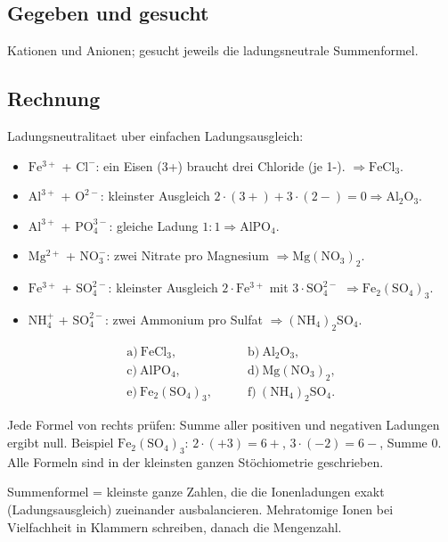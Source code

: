 
\subsection*{Gegeben und gesucht}
Kationen und Anionen; gesucht jeweils die ladungsneutrale Summenformel.

\subsection*{Rechnung}
Ladungsneutralitaet uber einfachen Ladungsausgleich:
\begin{itemize}
  \item[a)] $\mathrm{Fe^{3+}}$ + $\mathrm{Cl^-}$: ein Eisen (3+) braucht drei
        Chloride (je 1-). $\Rightarrow \mathrm{FeCl_3}$.
  \item[b)] $\mathrm{Al^{3+}}$ + $\mathrm{O^{2-}}$: kleinster Ausgleich
        $2\cdot(3+) + 3\cdot(2-) = 0 \Rightarrow \mathrm{Al_2O_3}$.
  \item[c)] $\mathrm{Al^{3+}}$ + $\mathrm{PO_4^{3-}}$: gleiche Ladung
        $1:1 \Rightarrow \mathrm{AlPO_4}$.
  \item[d)] $\mathrm{Mg^{2+}}$ + $\mathrm{NO_3^-}$: zwei Nitrate pro Magnesium
        $\Rightarrow \mathrm{Mg(NO_3)_2}$.
  \item[e)] $\mathrm{Fe^{3+}}$ + $\mathrm{SO_4^{2-}}$: kleinster Ausgleich
        $2\cdot\mathrm{Fe^{3+}}$ mit $3\cdot\mathrm{SO_4^{2-}}$
        $\Rightarrow \mathrm{Fe_2(SO_4)_3}$.
  \item[f)] $\mathrm{NH_4^+}$ + $\mathrm{SO_4^{2-}}$: zwei Ammonium pro Sulfat
        $\Rightarrow \mathrm{(NH_4)_2SO_4}$.
\end{itemize}

\begin{ergebnis}
\begin{align*}
  \mathrm{a)\ FeCl_3,} &\qquad \mathrm{b)\ Al_2O_3,}\\
  \mathrm{c)\ AlPO_4,} &\qquad \mathrm{d)\ Mg(NO_3)_2,}\\
  \mathrm{e)\ Fe_2(SO_4)_3,} &\qquad \mathrm{f)\ (NH_4)_2SO_4.}
\end{align*}
\end{ergebnis}

\begin{kontrolle}
Jede Formel von rechts prüfen: Summe aller positiven und negativen Ladungen
ergibt null. Beispiel $\mathrm{Fe_2(SO_4)_3}$:
$2\cdot(+3) = 6+$, $3\cdot(-2) = 6-$, Summe $0$. Alle Formeln sind in der
kleinsten ganzen Stöchiometrie geschrieben.
\end{kontrolle}

\begin{merksatz}
Summenformel = kleinste ganze Zahlen, die die Ionenladungen exakt
(Ladungsausgleich) zueinander ausbalancieren. Mehratomige Ionen bei Vielfachheit
in Klammern schreiben, danach die Mengenzahl.
\end{merksatz}
